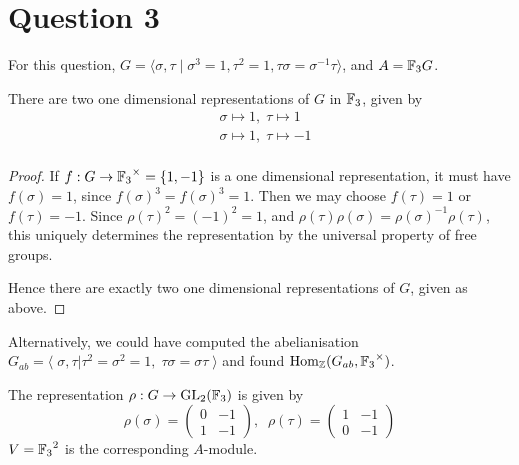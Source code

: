 \documentclass{unswmaths}
\begin{document}
\section*{Question 3}
For this question, $G = \langle \sigma,\tau\;|\;\sigma^3=1,\tau^2=1,\tau\sigma = \sigma^{-1}\tau\rangle$,
and $A = {\mathbb{F}_3} G$.

\begin{theorem}
\label{1dimreps}
    There are two one dimensional representations of $G$ in ${\mathbb{F}_3}$, given by
    \begin{align*}
        &\sigma\mapsto 1,\;\tau\mapsto 1\\
        &\sigma\mapsto 1,\;\tau\mapsto -1\\
    \end{align*}
\end{theorem}
\begin{proof}
        If $f:G\rightarrow {\mathbb{F}_3}^\times = \{1,-1\}$ is a one dimensional representation, it
        must have $f(\sigma) = 1$, since $f(\sigma)^3 = f(\sigma)^3 = 1$. 
        Then we may choose $f(\tau) = 1$ or $f(\tau) = -1$. Since $\rho(\tau)^2 = (-1)^2 = 1$,
        and $\rho(\tau)\rho(\sigma) = \rho(\sigma)^{-1}\rho(\tau)$, this uniquely
        determines the representation by the universal property of free groups.
        
        Hence there are exactly two one dimensional representations of $G$, given as above.
\end{proof}

Alternatively, we could have computed the abelianisation $G_{ab} = \langle\;\sigma,\tau|\tau^2 = \sigma^2 = 1,\;\tau\sigma =\sigma\tau\;\rangle$
and found $\operatorname{Hom}_{\mathbb{Z}}(G_{ab},{\mathbb{F}_3}^\times)$.

\begin{definition}
    The representation $\rho:G\rightarrow \operatorname{GL}_2({\mathbb{F}_3})$ is given by
    \begin{equation*}
        \rho(\sigma) = \begin{pmatrix}
            0 & -1\\
            1 & -1
        \end{pmatrix},\;\;
        \rho(\tau) = \begin{pmatrix}
            1 & -1\\
            0 & -1
        \end{pmatrix}
    \end{equation*}
    $V = {\mathbb{F}_3}^2$ is the corresponding $A$-module.
\end{definition}
\end{document}
